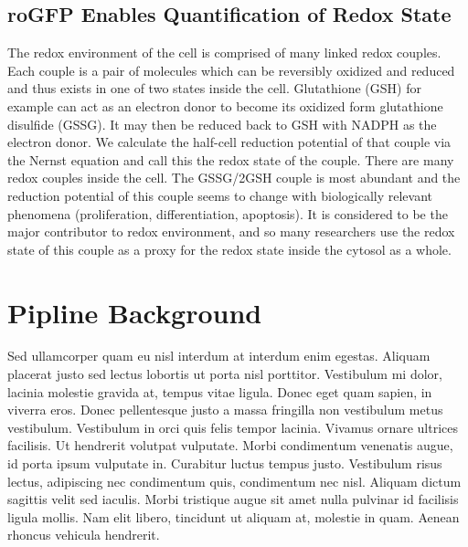 \subsection{roGFP Enables Quantification of Redox State}

The redox environment of the cell is comprised of many linked redox couples. Each couple is a pair of molecules which can be reversibly oxidized and reduced and thus exists in one of two states inside the cell. Glutathione (GSH) for example can act as an electron donor to become its oxidized form glutathione disulfide (GSSG). It may then be reduced back to GSH with NADPH as the electron donor. We calculate the half-cell reduction potential of that couple via the Nernst equation and call this the redox state of the couple. There are many redox couples inside the cell. The GSSG/2GSH couple is most abundant and the reduction potential of this couple seems to change with biologically relevant phenomena (proliferation, differentiation, apoptosis). It is considered to be the major contributor to redox environment, and so many researchers use the redox state of this couple as a proxy for the redox state inside the cytosol as a whole.


\section{Pipline Background}

Sed ullamcorper quam eu nisl interdum at interdum enim egestas. Aliquam placerat justo sed lectus lobortis ut porta nisl porttitor. Vestibulum mi dolor, lacinia molestie gravida at, tempus vitae ligula. Donec eget quam sapien, in viverra eros. Donec pellentesque justo a massa fringilla non vestibulum metus vestibulum. Vestibulum in orci quis felis tempor lacinia. Vivamus ornare ultrices facilisis. Ut hendrerit volutpat vulputate. Morbi condimentum venenatis augue, id porta ipsum vulputate in. Curabitur luctus tempus justo. Vestibulum risus lectus, adipiscing nec condimentum quis, condimentum nec nisl. Aliquam dictum sagittis velit sed iaculis. Morbi tristique augue sit amet nulla pulvinar id facilisis ligula mollis. Nam elit libero, tincidunt ut aliquam at, molestie in quam. Aenean rhoncus vehicula hendrerit.